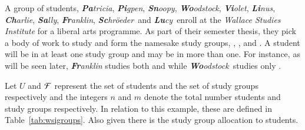 \documentclass[MS,synopsis]{iitmdiss}
\begin{document}
\def \xLLL {\mathbb{B}}
\def \xGGG {\mathbb{T}} 
\def \xBBB {\mathbb{W}}
\def \xTTT {\mathbb{F}}




\def \Pa {{\em {\bf Pa}tricia}} 
\def \Pi {{\em {\bf Pi}gpen}} %
\def \Sn {{\em {\bf Sn}oopy}}
\def \Wo {{\em {\bf Wo}odstock}}
\def \Vi {{\em {\bf Vi}olet}} 
\def \Li {{\em {\bf Li}nus}} 
\def \Ch {{\em {\bf Ch}arlie}}
\def \Sa {{\em {\bf Sa}lly}}
\def \Fr {{\em {\bf Fr}anklin}}  %
\def \Sc {{\em {\bf Sc}hr{\"o}eder}} 
\def \Lu {{\em {\bf Lu}cy}}

\def \xPa {{\bf Pa}} 
\def \xPi {{\bf Pi}} 
\def \xSn {{\bf Sn}}
\def \xWo {{\bf Wo}}
\def \xVi {{\bf Vi}} 
\def \xLi {{\bf Li}} 
\def \xCh {{\bf Ch}}
\def \xSa {{\bf Sa}}
\def \xFr {{\bf Fr}}
\def \xSc {{\bf Sc}} 
\def \xLu {{\bf Lu}}

\def \residenceblock {{\em Infinite Loop}}

\def \WSI {{\em Wallace Studies Institute}}

\def \coneohone {{\em ``Influence of post modernism in Wallace's work''}}
\def \coneohtwo {{\em ``A study on fragmented prose method''}}


A group of students, \Pa, \Pi, \Sn, \Wo, \Vi, \Li, \Ch, \Sa, \Fr,
  \Sc\ and \Lu\ enroll at the
{\WSI} for a liberal arts programme.  As part
of their semester thesis, they pick a body of work to study and form
the namesake study groups, {\LLL}, {\GGG}, {\BBB} and {\TTT}. A student
will be in at least one study group and may be in more than one. For
instance, as will be seen later, {\Fr} studies both {\LLL} and {\TTT}
while \Wo\ studies only \BBB.

Let $U$ and ${\cal F}$ represent the set of students and the set of study
groups respectively and the integers $n$ and $m$ denote the total
number students and study groups respectively. In relation to this
example, these are defined in Table~\ref{tab:wsigroups}. Also given
there is the study group allocation to students.
\end{document}
